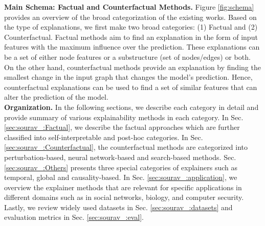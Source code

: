 \noindent
\textbf{Main Schema: Factual and Counterfactual Methods. } Figure \ref{fig:schema} provides an overview of the broad categorization of the existing works. Based on the type of explanations, we first make two broad categories: (1) Factual and (2) Counterfactual. Factual methods aim to
find an explanation in the form of input features with the maximum influence over the prediction. These explanations can be a set of either node features or a substructure (set of nodes/edges) or both. On the other hand, counterfactual methods provide an explanation by finding the smallest change in the input graph that changes the model's prediction. Hence, counterfactual explanations can be used to find a set of similar features that can alter the prediction of the model.\\
\noindent
\textbf{Organization. }In the following sections, we describe each category in detail and provide summary of various explainability methods in each category. In Sec. \ref{sec:sourav_:Factual}, we describe the factual approaches which are further classified into self-interpretable and post-hoc categories. In Sec. \ref{sec:sourav_:Counterfactual}, the counterfactual methods are categorized into perturbation-based, neural network-based and search-based methods. Sec. \ref{sec:sourav_:Others} presents three special categories of explainers such as temporal, global and causality-based. In Sec. \ref{sec:sourav_:application}, we overview the explainer methods that are relevant for specific applications in different domains such as in social networks, biology, and computer security. Lastly, we review widely used datasets in Sec. \ref{sec:sourav_:datasets} and evaluation metrics in Sec. \ref{sec:sourav_:eval}.









